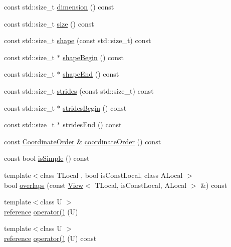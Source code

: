 \begin{DoxyCompactItemize}
\item 
const std\+::size\+\_\+t \hyperlink{classandres_1_1View_a836c6755b62d6e619d043adcf8b91fab}{dimension} () const
\item 
const std\+::size\+\_\+t \hyperlink{classandres_1_1View_aac6f255defbd6e6c5c2f16ea62dbb0e2}{size} () const
\item 
const std\+::size\+\_\+t \hyperlink{classandres_1_1View_a981d648b453590bed7026754b09dbaba}{shape} (const std\+::size\+\_\+t) const
\item 
const std\+::size\+\_\+t $\ast$ \hyperlink{classandres_1_1View_a72b399659898eaa801789190ff6ea6a8}{shape\+Begin} () const
\item 
const std\+::size\+\_\+t $\ast$ \hyperlink{classandres_1_1View_a351674c9a47edf095f74792dba4860e7}{shape\+End} () const
\item 
const std\+::size\+\_\+t \hyperlink{classandres_1_1View_ab523efc66788e8025f88b5fca0fa9d0e}{strides} (const std\+::size\+\_\+t) const
\item 
const std\+::size\+\_\+t $\ast$ \hyperlink{classandres_1_1View_aae2009aeccd7029a7c31767764d09677}{strides\+Begin} () const
\item 
const std\+::size\+\_\+t $\ast$ \hyperlink{classandres_1_1View_ab193e982560b93da97e8755de0980525}{strides\+End} () const
\item 
const \hyperlink{namespaceandres_a2ac8b7aa89d44e8188a7c0ba50f4306b}{Coordinate\+Order} \& \hyperlink{classandres_1_1View_ab55ce6d7982b6c3804766925d48a19f4}{coordinate\+Order} () const
\item 
const bool \hyperlink{classandres_1_1View_a3f6bf9dc15389945a30f01a000c1d2a5}{is\+Simple} () const
\item 
{\footnotesize template$<$class T\+Local , bool is\+Const\+Local, class A\+Local $>$ }\\bool \hyperlink{classandres_1_1View_a7e8389616597a1f352251dde3a60304b}{overlaps} (const \hyperlink{classandres_1_1View}{View}$<$ T\+Local, is\+Const\+Local, A\+Local $>$ \&) const
\item 
{\footnotesize template$<$class U $>$ }\\\hyperlink{classandres_1_1View_aebdd1f19272b743b4422ff8ba18fc11a}{reference} \hyperlink{classandres_1_1View_a8c9e16f74973fefb3bacb1c7fb844441}{operator()} (U)
\item 
{\footnotesize template$<$class U $>$ }\\\hyperlink{classandres_1_1View_aebdd1f19272b743b4422ff8ba18fc11a}{reference} \hyperlink{classandres_1_1View_af2eee05fbdb19bf6cde729c05410208c}{operator()} (U) const

\end{DoxyCompactItemize}
